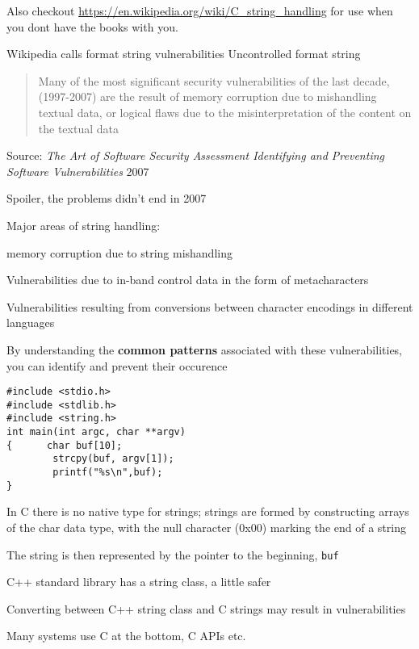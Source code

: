 \documentclass[Screen16to9,17pt]{foils}
\begin{document}
Also checkout \url{https://en.wikipedia.org/wiki/C_string_handling}
for use when you dont have the books with you.

Wikipedia calls format string vulnerabilities Uncontrolled format string 




\begin{quote}
Many of the most significant security vulnerabilities of the last decade, (1997-2007) are the result of memory corruption due to mishandling textual data, or logical flaws due to the misinterpretation of the content on the textual data
\end{quote}
Source: \emph{The Art of Software Security Assessment Identifying and Preventing
Software Vulnerabilities} 2007

\begin{list1}
\item Spoiler, the problems didn't end in 2007
\item Major areas of string handling:
\begin{list2}
\item memory corruption due to string mishandling
\item Vulnerabilities due to in-band control data in the form of metacharacters
\item Vulnerabilities resulting from conversions between character encodings in different languages
\end{list2}
\item By understanding the {\bf common patterns} associated with these vulnerabilities, you can identify and prevent their occurence
\end{list1}



\begin{verbatim}
#include <stdio.h>
#include <stdlib.h>
#include <string.h>
int main(int argc, char **argv)
{      char buf[10];
        strcpy(buf, argv[1]);
        printf("%s\n",buf);
}
\end{verbatim}


\begin{list2}
\item In C there is no native type for strings; strings are formed by constructing arrays of the char data type, with the null character (0x00) marking the end of a string
\item The string is then represented by the pointer to the beginning, \verb+buf+
\item C++ standard library has a string class, a little safer
\item Converting between C++ string class and C strings may result in vulnerabilities
\item Many systems use C at the bottom, C APIs etc.
\end{list2}
\end{document}
